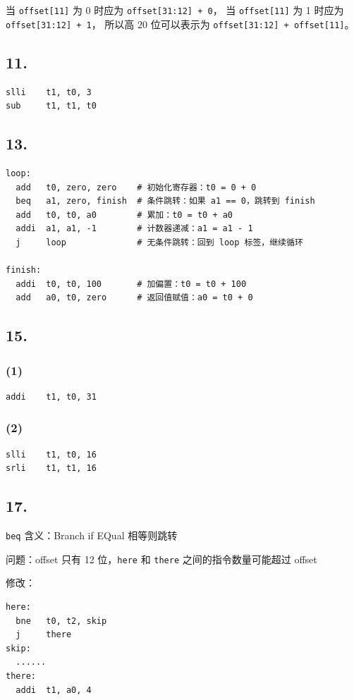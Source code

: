 \documentclass[12pt, a4paper]{ctexart}
\begin{document}
当 \texttt{offset[11]} 为 0 时应为 \texttt{offset[31:12] + 0}，
当 \texttt{offset[11]} 为 1 时应为 \texttt{offset[31:12] + 1}，
所以高 20 位可以表示为 \texttt{offset[31:12] + offset[11]}。

\subsection*{11.}

\begin{lstlisting}[language={[RISC-V]Assembler}]
slli    t1, t0, 3
sub     t1, t1, t0
\end{lstlisting}

\subsection*{13.}

\begin{lstlisting}[language={[RISC-V]Assembler}]
loop:
  add   t0, zero, zero    # 初始化寄存器：t0 = 0 + 0
  beq   a1, zero, finish  # 条件跳转：如果 a1 == 0，跳转到 finish
  add   t0, t0, a0        # 累加：t0 = t0 + a0
  addi  a1, a1, -1        # 计数器递减：a1 = a1 - 1
  j     loop              # 无条件跳转：回到 loop 标签，继续循环

finish:
  addi  t0, t0, 100       # 加偏置：t0 = t0 + 100
  add   a0, t0, zero      # 返回值赋值：a0 = t0 + 0
\end{lstlisting}

\subsection*{15.}

\subsubsection*{(1)}

\begin{lstlisting}[language={[RISC-V]Assembler}]
addi    t1, t0, 31
\end{lstlisting}

\subsubsection*{(2)}

\begin{lstlisting}[language={[RISC-V]Assembler}]
slli    t1, t0, 16
srli    t1, t1, 16
\end{lstlisting}

\subsection*{17.}

\texttt{beq} 含义：Branch if EQual 相等则跳转

问题：offset 只有 12 位，\texttt{here} 和 \texttt{there} 之间的指令数量可能超过 offset

修改：

\begin{lstlisting}
here:
  bne   t0, t2, skip
  j     there
skip:
  ......
there:
  addi  t1, a0, 4
\end{lstlisting}
\end{document}
